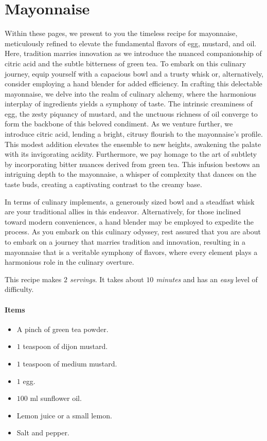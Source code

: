 \section{Mayonnaise}
\label{mayonnaise}
Within these pages, we present to you the timeless recipe for mayonnaise, meticulously refined to elevate the fundamental flavors of egg, mustard, and oil. Here, tradition marries innovation as we introduce the nuanced companionship of citric acid and the subtle bitterness of green tea. To embark on this culinary journey, equip yourself with a capacious bowl and a trusty whisk or, alternatively, consider employing a hand blender for added efficiency. In crafting this delectable mayonnaise, we delve into the realm of culinary alchemy, where the harmonious interplay of ingredients yields a symphony of taste. The intrinsic creaminess of egg, the zesty piquancy of mustard, and the unctuous richness of oil converge to form the backbone of this beloved condiment. As we venture further, we introduce citric acid, lending a bright, citrusy flourish to the mayonnaise's profile. This modest addition elevates the ensemble to new heights, awakening the palate with its invigorating acidity. Furthermore, we pay homage to the art of subtlety by incorporating bitter nuances derived from green tea. This infusion bestows an intriguing depth to the mayonnaise, a whisper of complexity that dances on the taste buds, creating a captivating contrast to the creamy base.

In terms of culinary implements, a generously sized bowl and a steadfast whisk are your traditional allies in this endeavor. Alternatively, for those inclined toward modern conveniences, a hand blender may be employed to expedite the process. As you embark on this culinary odyssey, rest assured that you are about to embark on a journey that marries tradition and innovation, resulting in a mayonnaise that is a veritable symphony of flavors, where every element plays a harmonious role in the culinary overture.

This recipe makes \emph{$2$ servings}. It takes about \emph{$10$ minutes} and has an \emph{easy} level of difficulty.

\paragraph{Items}
\begin{itemize}[noitemsep]
    \item[\ding{182}] A pinch of green tea powder.
    \item[\ding{183}] $1$ teaspoon of dijon mustard.
    \item[\ding{184}] $1$ teaspoon of medium mustard.
    \item[\ding{185}] $1$ egg.
    \item[\ding{186}] $100$ ml sunflower oil.
    \item[\ding{187}] Lemon juice or a small lemon.
    \item[\ding{188}] Salt and pepper.
    
\end{itemize}

